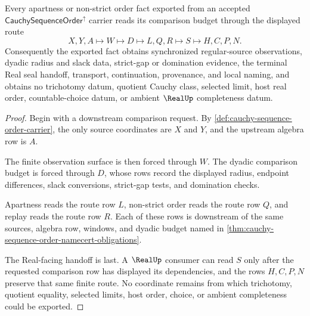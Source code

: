 \begin{theorem}
\label{thm:cauchy-sequence-order-dyadic-budget-exactness}
Every apartness or non-strict order fact exported from an accepted $\mathsf{CauchySequenceOrder}^{\uparrow}$ carrier reads its comparison budget through the displayed route
$$
X,Y,A \longmapsto W \longmapsto D \longmapsto L,Q,R \longmapsto S \longmapsto H,C,P,N .
$$
Consequently the exported fact obtains synchronized regular-source observations, dyadic radius and slack data, strict-gap or domination evidence, the terminal Real seal handoff, transport, continuation, provenance, and local naming, and obtains no trichotomy datum, quotient Cauchy class, selected limit, host real order, countable-choice datum, or ambient $\RealUp$ completeness datum.
\end{theorem}
\begin{proof}
Begin with a downstream comparison request. By \autoref{def:cauchy-sequence-order-carrier}, the only source coordinates are $X$ and $Y$, and the upstream algebra row is $A$.

The finite observation surface is then forced through $W$. The dyadic comparison budget is forced through $D$, whose rows record the displayed radius, endpoint differences, slack conversions, strict-gap tests, and domination checks.

Apartness reads the route row $L$, non-strict order reads the route row $Q$, and replay reads the route row $R$. Each of these rows is downstream of the same sources, algebra row, windows, and dyadic budget named in \autoref{thm:cauchy-sequence-order-namecert-obligations}.

The Real-facing handoff is last. A $\RealUp$ consumer can read $S$ only after the requested comparison row has displayed its dependencies, and the rows $H,C,P,N$ preserve that same finite route. No coordinate remains from which trichotomy, quotient equality, selected limits, host order, choice, or ambient completeness could be exported.
\end{proof}

